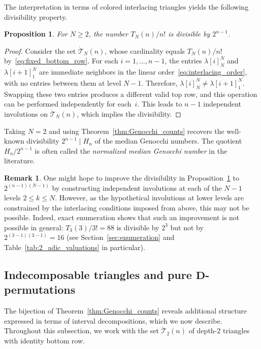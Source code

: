 \documentclass[pdftex]{sigma}
\numberwithin{equation}{section}
\newtheorem{Proposition}[Theorem]{Proposition}
\theoremstyle{definition}
\newtheorem{Remark}[Theorem]{Remark}
\begin{document}
The interpretation in terms of colored interlacing triangles
  yields the following divisibility property.

\begin{Proposition}\label{Prop2.3}
For $N\ge2$, the number $T_N(n)/n!$ is
  divisible by $2^{n-1}$.
\end{Proposition}

\begin{proof} Consider the set $\mathring{\mathcal{T}}_N(n)$, whose
  cardinality equals $T_N(n)/n!$ by~\eqref{eq:fixed_bottom_row}. For each
  $i=1,\ldots,n-1$, the entries $\lambda[i]^N_N$ and
  $\lambda[i+1]^N_1$ are immediate neighbors in the linear order~\eqref{eq:interlacing_order}, with no entries between them at level $N-1$. Therefore,
  $\lambda[i]^N_N \ne \lambda[i+1]^N_1$. Swapping these two
  entries produces a different valid top row, and this operation
  can be performed independently for each~$i$. This leads to
  $n-1$ independent involutions on $\mathring{\mathcal{T}}_N(n)$,
  which implies the divisibility.
\end{proof}

  Taking $N=2$ and using Theorem~\ref{thm:Genocchi_counts} recovers the well-known
  divisibility $2^{n-1} \mid H_n$ of the median Genocchi numbers.
  The quotient~$H_n/2^{n-1}$ is often called the \emph{normalized
  median Genocchi number} in the literature.

\begin{Remark}
	\label{rem:divisibility_no_improvement} One might hope to improve the
	divisibility in Proposition~\ref{Prop2.3} to $2^{(n-1)(N-1)}$
	by constructing independent involutions at each of the $N-1$ levels
	$2\le k \le N$.
	However, as the hypothetical involutions at lower levels are constrained by
	the interlacing conditions imposed from above, this may not be possible.
	Indeed, exact enumeration shows that such an improvement is not possible in
	general: $T_3(3)/3! = 88$ is divisible by $2^3$ but not by
	${2^{(3-1)(3-1)} = 16}$ (see Section~\ref{sec:enumeration} and
	Table~\ref{tab:2_adic_valuations} in particular).
\end{Remark}

\subsection[Indecomposable triangles and pure D-permutations]{Indecomposable triangles and pure $\boldsymbol{D}$-permutations}
\label{subsec:indecomposable_pure}

The bijection of Theorem~\ref{thm:Genocchi_counts} reveals
additional structure expressed in terms of interval
decompositions, which we now describe.  Throughout this
subsection, we work with the set
$\mathring{\mathcal{T}}_2(n)$ of depth-$2$ triangles with
identity bottom row.
\end{document}
